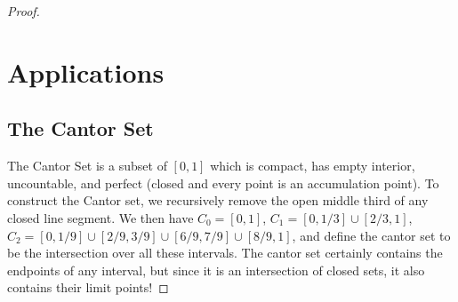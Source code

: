 \documentclass[12pt, a4paper]{book}
\theoremstyle{nonumberplain}
\newtheorem{proof}{Proof}
\begin{document}
\begin{proof}
\section{Applications}
\subsection{The Cantor Set}\label{cantor}
The Cantor Set is a subset of $[0,1]$ which is compact, has empty interior, uncountable, and perfect (closed and every point
is an accumulation point). To construct the Cantor set, we recursively remove the open middle third of any closed line segment.
We then have $C_0=[0,1]$, $C_1=[0,1/3]\cup[2/3,1]$, $C_2=[0,1/9]\cup[2/9,3/9]\cup[6/9,7/9]\cup[8/9,1]$, and define the cantor
set to be the intersection over all these intervals. The cantor set certainly contains the endpoints of any interval, but
since it is an intersection of closed sets, it also contains their limit points!


\end{proof}
\end{document}
